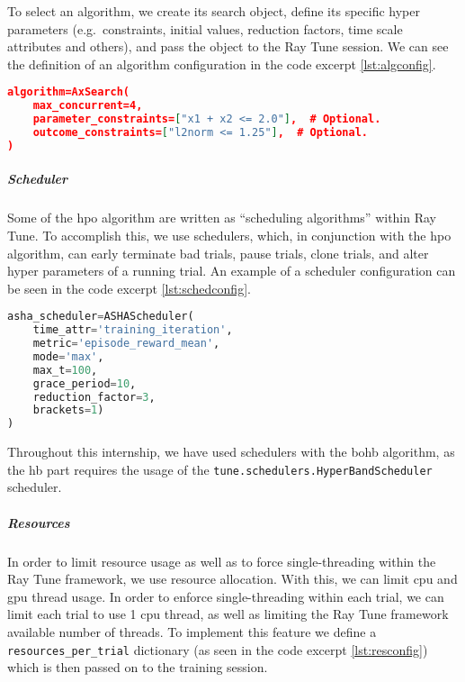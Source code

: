 To select an algorithm, we create its search object, define its specific hyper parameters (e.g.\ constraints, initial values, reduction factors, time scale attributes and others), and pass the object to the Ray Tune session. We can see the definition of an algorithm configuration in the code excerpt \ref{lst:algconfig}.

\begin{lstlisting}[language=json, caption=Example algorithm configuration, captionpos=b, label={lst:algconfig}]
algorithm=AxSearch(
    max_concurrent=4,
    parameter_constraints=["x1 + x2 <= 2.0"],  # Optional.
    outcome_constraints=["l2norm <= 1.25"],  # Optional.
)
\end{lstlisting}

\subparagraph{Scheduler}

Some of the \acrshort{hpo} algorithm are written as ``scheduling algorithms'' within Ray Tune. To accomplish this, we use schedulers, which, in conjunction with the \acrshort{hpo} algorithm, can early terminate bad trials, pause trials, clone trials, and alter hyper parameters of a running trial. An example of a scheduler configuration can be seen in the code excerpt \ref{lst:schedconfig}.

\newpage
\begin{lstlisting}[language=Python, caption=Example trial scheduler configuration, captionpos=b, label={lst:schedconfig}]
asha_scheduler=ASHAScheduler(
    time_attr='training_iteration',
    metric='episode_reward_mean',
    mode='max',
    max_t=100,
    grace_period=10,
    reduction_factor=3,
    brackets=1)
)
\end{lstlisting}

Throughout this internship, we have used schedulers with the \acrshort{bohb} algorithm, as the \acrshort{hb} part requires the usage of the \verb!tune.schedulers.HyperBandScheduler! scheduler.

\subparagraph{Resources}

In order to limit resource usage as well as to force single-threading within the Ray Tune framework, we use resource allocation. With this, we can limit \acrshort{cpu} and \acrshort{gpu} thread usage. In order to enforce single-threading within each trial, we can limit each trial to use 1 \acrshort{cpu} thread, as well as limiting the Ray Tune framework available number of threads. To implement this feature we define a \verb!resources_per_trial! dictionary (as seen in the code excerpt \ref{lst:resconfig}) which is then passed on to the training session.

